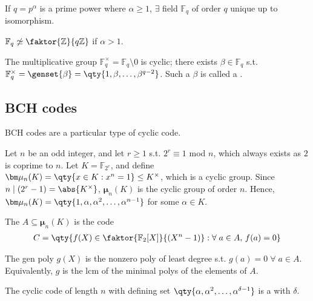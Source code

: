 \begin{theorem}
    If $q = p^\alpha$ is a prime power where $\alpha \geq 1$, $\exists$ field $\mathbb F_q$ of order $q$ unique up to isomorphism.
\end{theorem}

\begin{warning}
    $\mathbb F_q \not\simeq \faktor{\mathbb Z}{q\mathbb Z}$ if $\alpha > 1$.
\end{warning}

\begin{theorem}
    The multiplicative group $\mathbb F_q^\times = \mathbb{F}_q \setminus \qty{0}$ is cyclic; there exists $\beta \in \mathbb F_q$ s.t. $\mathbb F_q^\times = \genset{\beta} = \qty{1, \beta, \dots, \beta^{q-2}}$.
    Such a $\beta$ is called a .
\end{theorem}

\subsection{BCH codes}

BCH codes are a particular type of cyclic code.

Let $n$ be an odd integer, and let $r \geq 1$ s.t. $2^r \equiv 1$ mod $n$, which always exists as $2$ is coprime to $n$.
Let $K = \mathbb F_{2^r}$, and define $\bm \mu_n(K) = \qty{x \in K : x^n = 1} \leq K^\times$, which is a cyclic group.
Since $n \mid (2^r - 1) = \abs{K^\times}$, $\bm \mu_n(K)$ is the cyclic group of order $n$.
Hence, $\bm \mu_n(K) = \qty{1, \alpha, \alpha^2, \dots, \alpha^{n-1}}$ for some  $\alpha \in K$.

\begin{definition}
    The  $A \subseteq \bm\mu_n(K)$ is the code
    \begin{align*}
        C = \qty{f(X) \in \faktor{\mathbb F_2[X]}{(X^n - 1)} : \forall \; a \in A,\, f(a) = 0}
    \end{align*}
\end{definition}

The gen poly $g(X)$ is the nonzero poly of least degree s.t. $g(a) = 0 \; \forall \; a \in A$.
Equivalently, $g$ is the lcm of the minimal polys of the elements of $A$.

\begin{definition}
    The cyclic code of length $n$ with defining set $\qty{\alpha, \alpha^2, \dots, \alpha^{\delta - 1}}$ is a  with  $\delta$.
\end{definition}


